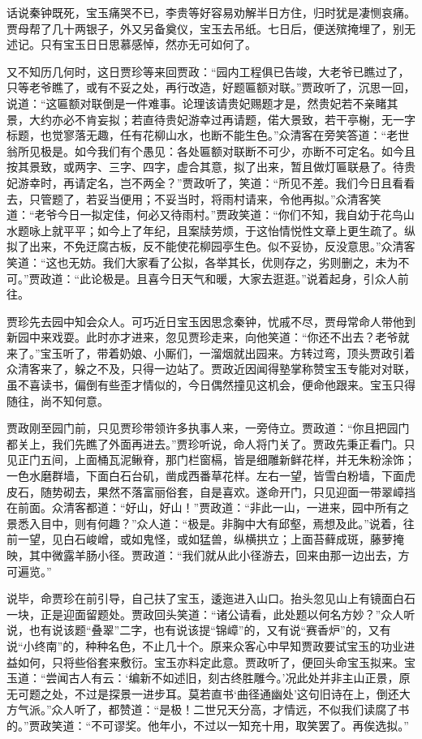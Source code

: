\documentclass[12pt,oneside]{book}
\begin{document}
话说秦钟既死，宝玉痛哭不已，李贵等好容易劝解半日方住，归时犹是凄恻哀痛。贾母帮了几十两银子，外又另备奠仪，宝玉去吊纸。七日后，便送殡掩埋了，别无述记。只有宝玉日日思慕感悼，然亦无可如何了。

又不知历几何时，这日贾珍等来回贾政：“园内工程俱已告竣，大老爷已瞧过了，只等老爷瞧了，或有不妥之处，再行改造，好题匾额对联。”贾政听了，沉思一回，说道：“这匾额对联倒是一件难事。论理该请贵妃赐题才是，然贵妃若不亲睹其景，大约亦必不肯妄拟；若直待贵妃游幸过再请题，偌大景致，若干亭榭，无一字标题，也觉寥落无趣，任有花柳山水，也断不能生色。”众清客在旁笑答道：“老世翁所见极是。如今我们有个愚见：各处匾额对联断不可少，亦断不可定名。如今且按其景致，或两字、三字、四字，虚合其意，拟了出来，暂且做灯匾联悬了。待贵妃游幸时，再请定名，岂不两全？”贾政听了，笑道：“所见不差。我们今日且看看去，只管题了，若妥当便用；不妥当时，将雨村请来，令他再拟。”众清客笑道：“老爷今日一拟定佳，何必又待雨村。”贾政笑道：“你们不知，我自幼于花鸟山水题咏上就平平；如今上了年纪，且案牍劳烦，于这怡情悦性文章上更生疏了。纵拟了出来，不免迂腐古板，反不能使花柳园亭生色。似不妥协，反没意思。”众清客笑道：“这也无妨。我们大家看了公拟，各举其长，优则存之，劣则删之，未为不可。”贾政道：“此论极是。且喜今日天气和暖，大家去逛逛。”说着起身，引众人前往。

贾珍先去园中知会众人。可巧近日宝玉因思念秦钟，忧戚不尽，贾母常命人带他到新园中来戏耍。此时亦才进来，忽见贾珍走来，向他笑道：“你还不出去？老爷就来了。”宝玉听了，带着奶娘、小厮们，一溜烟就出园来。方转过弯，顶头贾政引着众清客来了，躲之不及，只得一边站了。贾政近因闻得塾掌称赞宝玉专能对对联，虽不喜读书，偏倒有些歪才情似的，今日偶然撞见这机会，便命他跟来。宝玉只得随往，尚不知何意。

贾政刚至园门前，只见贾珍带领许多执事人来，一旁侍立。贾政道：“你且把园门都关上，我们先瞧了外面再进去。”贾珍听说，命人将门关了。贾政先秉正看门。只见正门五间，上面桶瓦泥鳅脊，那门栏窗槅，皆是细雕新鲜花样，并无朱粉涂饰；一色水磨群墙，下面白石台矶，凿成西番草花样。左右一望，皆雪白粉墙，下面虎皮石，随势砌去，果然不落富丽俗套，自是喜欢。遂命开门，只见迎面一带翠嶂挡在前面。众清客都道：“好山，好山！”贾政道：“非此一山，一进来，园中所有之景悉入目中，则有何趣？”众人道：“极是。非胸中大有邱壑，焉想及此。”说着，往前一望，见白石峻嶒，或如鬼怪，或如猛兽，纵横拱立；上面苔藓成斑，藤萝掩映，其中微露羊肠小径。贾政道：“我们就从此小径游去，回来由那一边出去，方可遍览。”

说毕，命贾珍在前引导，自己扶了宝玉，逶迤进入山口。抬头忽见山上有镜面白石一块，正是迎面留题处。贾政回头笑道：“诸公请看，此处题以何名方妙？”众人听说，也有说该题“叠翠”二字，也有说该提“锦嶂”的，又有说“赛香炉”的，又有说“小终南”的，种种名色，不止几十个。原来众客心中早知贾政要试宝玉的功业进益如何，只将些俗套来敷衍。宝玉亦料定此意。贾政听了，便回头命宝玉拟来。宝玉道：“尝闻古人有云：‘编新不如述旧，刻古终胜雕今。’况此处并非主山正景，原无可题之处，不过是探景一进步耳。莫若直书‘曲径通幽处’这句旧诗在上，倒还大方气派。”众人听了，都赞道：“是极！二世兄天分高，才情远，不似我们读腐了书的。”贾政笑道：“不可谬奖。他年小，不过以一知充十用，取笑罢了。再俟选拟。”
\end{document}

